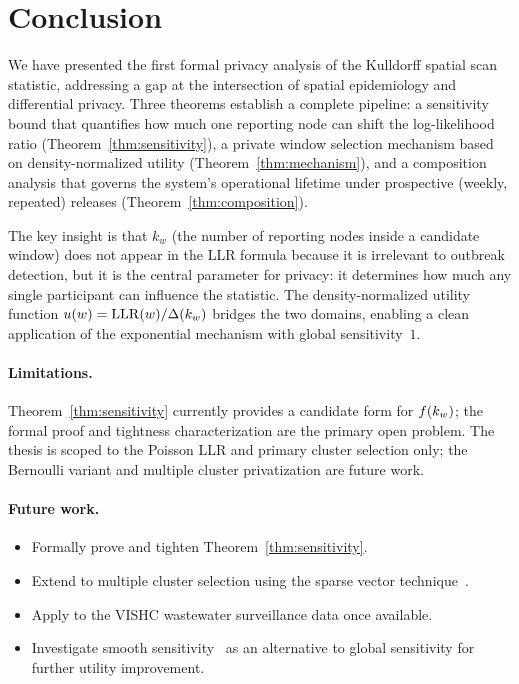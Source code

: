 
\section{Conclusion}
\label{sec:conclusion}

We have presented the first formal privacy analysis of the Kulldorff spatial scan
statistic, addressing a gap at the intersection of spatial epidemiology and differential
privacy.
Three theorems establish a complete pipeline: a sensitivity bound that quantifies
how much one reporting node can shift the log-likelihood ratio (Theorem~\ref{thm:sensitivity}),
a private window selection mechanism based on density-normalized utility
(Theorem~\ref{thm:mechanism}), and a composition analysis that governs the system's
operational lifetime under prospective (weekly, repeated) releases
(Theorem~\ref{thm:composition}).

The key insight is that $k_w$ (the number of reporting nodes inside a candidate
window) does not appear in the LLR formula because it is irrelevant to outbreak
detection, but it is the central parameter for privacy: it determines how much any
single participant can influence the statistic.
The density-normalized utility function $u(w) = \mathrm{LLR}(w)/\Delta(k_w)$ bridges the
two domains, enabling a clean application of the exponential mechanism with global
sensitivity~$1$.

\paragraph{Limitations.}
Theorem~\ref{thm:sensitivity} currently provides a candidate form for $f(k_w)$;
the formal proof and tightness characterization are the primary open problem.
The thesis is scoped to the Poisson LLR and primary cluster selection only;
the Bernoulli variant and multiple cluster privatization are future work.

\paragraph{Future work.}
\begin{itemize}
    \item Formally prove and tighten Theorem~\ref{thm:sensitivity}.
    \item Extend to multiple cluster selection using the sparse vector technique~\cite{dwork2013}.
    \item Apply to the VISHC wastewater surveillance data once available.
    \item Investigate smooth sensitivity~\cite{nissim2007} as an alternative to
          global sensitivity for further utility improvement.
\end{itemize}
